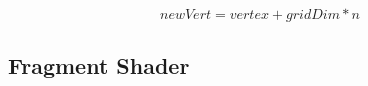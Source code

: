 \begin{displaymath}
  newVert = vertex + gridDim * n
\end{displaymath}







\subsection{Fragment Shader}\label{sec:grassFrag}







